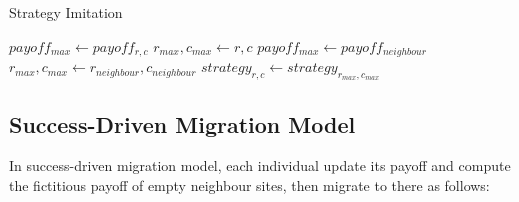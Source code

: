 \documentclass[11pt]{article}
\begin{document}
\begin{algorithm}[H]
  \caption{Strategy Imitation}\label{imitation}
  \begin{algorithmic}[1]
      \State $payoff_{max} \gets payoff_{r,c}$
      \State $r_{max},c_{max} \gets r,c$
        \State $payoff_{max} \gets payoff_{neighbour}$
        \State $r_{max},c_{max} \gets r_{neighbour},c_{neighbour}$
        \EndIf
      \EndFor
      \State $strategy_{r,c} \gets strategy_{r_{max},c_{max}}$   
    \EndProcedure
  \end{algorithmic}
\end{algorithm}


\subsection{Success-Driven Migration Model}
In success-driven migration model, each individual update its payoff and compute the fictitious payoff of empty neighbour sites, then migrate to there as follows:
\end{document}
